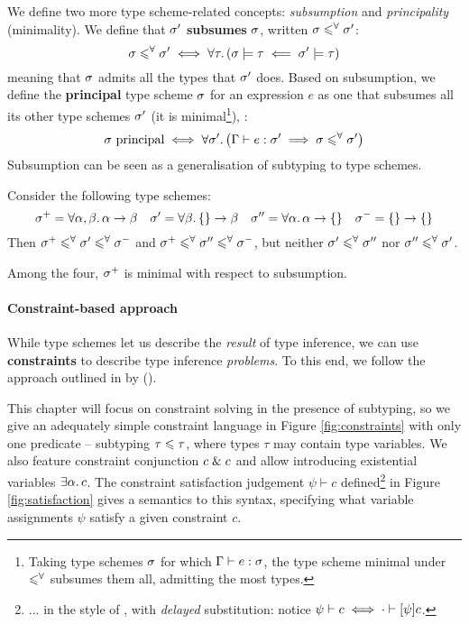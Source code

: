 We define two more type scheme-related concepts: \emph{subsumption} and \emph{principality} (minimality). We define that $\sigma'$ \textbf{subsumes} $\sigma$, written $\sigma \leqslant^\forall \sigma'$:
$$ \sigma \leqslant^\forall \sigma' \iff \forall \tau \ldotp (\sigma \models \tau \impliedby \sigma' \models \tau) $$
meaning that $\sigma$ admits all the types that $\sigma'$ does. 
Based on subsumption, we define the \textbf{principal} type scheme $\sigma$ for an expression $e$ as one that subsumes all its other type schemes $\sigma'$ (it is minimal\footnote{Taking type schemes $\sigma$ for which $\Gamma \vdash e : \sigma$, the type scheme minimal under $\leqslant^\forall$ subsumes them all, admitting the most types.}), \ie{}:
$$ \sch\text{ principal} \iff \forall \sch' \ldotp \left( \Gamma \vdash e : \sch' \implies \sch \subsume \sch' \right) $$
Subsumption can be seen as a generalisation of subtyping to type schemes.
\begin{example}
Consider the following type schemes:
$$    \sch^+ = \forall \alpha, \beta \ldotp \alpha \to \beta
\quad \sch' = \forall \beta \ldotp \flrec{} \to \beta 
\quad \sch'' = \forall \alpha \ldotp \alpha \to \flrec{} 
\quad \sch^- = \flrec{} \to \flrec{} $$
Then $\sigma^+ \leqslant^\forall \sigma' \leqslant^\forall \sigma^-$ and $\sigma^+ \leqslant^\forall \sigma'' \leqslant^\forall \sigma^-$, but neither $\sigma' \leqslant^\forall \sigma''$ nor $\sigma'' \leqslant^\forall \sigma'$. 

Among the four, $\sigma^+$ is minimal with respect to subsumption.
\end{example}

\paragraph{Constraint-based approach} While type schemes let us describe the \emph{result} of type inference, we can use \textbf{constraints} to describe type inference \emph{problems}. To this end, we follow the approach outlined in  by \textcite{essence-of-ml-type-inference} (\textcite[Chapter~10]{adv-tapl}).

This chapter will focus on constraint solving in the presence of subtyping, so we give an adequately simple constraint language in Figure \ref{fig:constraints} with only one predicate -- subtyping $\tau \leqslant \tau$, where types $\tau$ may contain type variables. We also feature constraint conjunction $c \;\&\; c$ and allow introducing existential variables $\exists \alpha \ldotp c$. The constraint satisfaction judgement $\psi \vdash c$ defined\footnote{... in the style of \textcite{constraint-based-freeze-ml}, with \emph{delayed} substitution: notice $\psi \vdash c \iff \cdot \vdash \substx \psi c$.} in Figure \ref{fig:satisfaction} gives a semantics to this syntax, specifying what variable assignments $\psi$ satisfy a given constraint $c$. 


